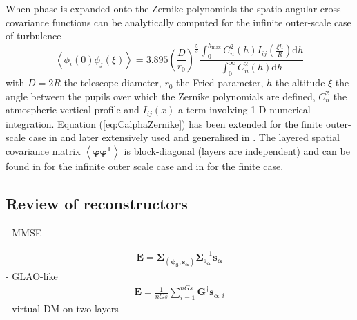 \documentclass[a4paper,12pt]{article}
\newcommand{\average}[1]{\left \langle {#1} \right \rangle}
\newcommand{\T}{\mathsf{T}} %
\newcommand{\0}{\mathsf{0}} %
\newcommand{\Emv}{\mathbf{E}} %
\newcommand{\CovMat}{\boldsymbol{\Sigma}} %
\newcommand{\D}{\mathbf{G}} %
\newcommand{\dint}{\mathrm{d}} %
\newcommand{\alphavec}{{\boldsymbol{\alpha}}}
\newcommand{\betavec}{{\boldsymbol{\beta}}}
\newcommand{\phivec}{{\boldsymbol{\psi}}}
\newcommand{\varphivec}{{\boldsymbol{\varphi}}}
\newcommand{\svec}{{\mathbf{s}}}
\begin{document}
When phase is expanded onto the Zernike polynomials the spatio-angular cross-covariance functions can be analytically computed
 for the infinite outer-scale case of turbulence \cite{valley79, chassat92}
\begin{equation}\label{eq:CalphaZernike}
\average{\phi_i(0) \phi_j(\xi)} =
  3.895\left(\frac{D}{r_0}\right)^{\frac{5}{3}}
  \frac{\int_0^{h_\text{max}} C_n^2(h)I_{ij}\left(\frac{\xi
          h}{R}\right) \dint h}{\int_0^\infty C_n^2(h) \dint h}
\end{equation}
with $D=2R$ the telescope diameter, $r_0$ the Fried parameter, $h$ the
altitude $\xi$ the angle between the pupils over which
the Zernike polynomials are defined, $C_n^2$ the atmospheric vertical profile and $I_{ij}(x)$ a term involving 1-D numerical integration. 
Equation (\ref{eq:CalphaZernike}) has been extended for the finite
outer-scale case in \cite{takato95} and later extensively used and
generalised in \cite{whiteley98, whiteley98a}. The layered spatial
covariance matrix $\average{ \varphivec \varphivec^\T}$ is block-diagonal (layers are independent) and can be found in \cite{noll76} for 
the infinite outer scale case and in \cite{winker91} for the finite case.




\subsection{Review of reconstructors }
- MMSE

\begin{align}
\Emv = 
\CovMat_{(\phivec_\betavec,\svec_\alphavec)}\CovMat^{-1}_{\svec_\alphavec} {\svec}_\alphavec 
\end{align}
- GLAO-like
\begin{align}
\Emv = \frac{1}{nGs}\sum_{i=1}^{nGs} \D^\dag{\svec}_{\alphavec,i} 
\end{align}
- virtual DM on two layers
\end{document}
